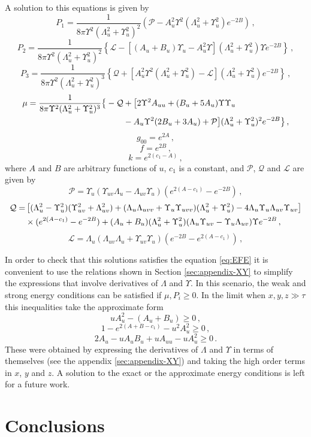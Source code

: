 \documentclass[12pt, ams, nofootinbib]{revtex4}
\def\be{\begin{equation}}
\def\ee{\end{equation}}
\def\X{\Lambda}
\def\Y{\Upsilon}
\newcommand{\rob}[1]{\left(#1\right)}    %
\newcommand{\sqb}[1]{\left[#1\right]}    %
\newcommand{\cub}[1]{\left\{#1\right\}}  %
\newcommand{\mc}[1]{\mathcal{#1}}        %
\theoremstyle{definition}
\begin{document}
A solution to this equations is given by
\be
	P_1 = \frac{1}{8\pi\Y^2(\X_u^2+\Y_u^2)^2}\rob{\mc{P}-A_u^2\Y^2(\X_u^2+\Y_u^2)e^{-2B}} \,,
\ee
\be
	P_2 = \frac{1}{8\pi\Y^2(\X_u^2+\Y_u^2)^2}\cub{\mc{L}-\sqb{(A_u+B_u)\Y_u-A_u^2\Y}(\X_u^2+\Y_u^2)\Y e^{-2B}}\,,
\ee
\be
	P_3 = \frac{1}{8\pi\Y^2(\X_u^2+\Y_u^2)^3}\cub{\mc{Q}+\sqb{A_u^2\Y^2(\X_u^2+\Y_u^2)-\mc{L}}(\X_u^2+\Y_u^2)e^{-2B}}\,,
\ee
\begin{align}
	\mu = \frac{1}{8\pi\Y^2(\X_u^2+\Y_u^2)^3}\big\{ -\mc{Q} &+ \big[2\Y^2A_{uu}+(B_u+5A_u)\Y\Y_u \notag \\
	&-A_u\Y^2(2B_u+3A_u)+\mc{P}\big](\X_u^2+\Y_u^2)^2e^{-2B} \big\}\,,
\end{align}
\be
	g_{00} = e^{2A}\,,
\ee
\be
	f = e^{2B}\,,
\ee
\be
	k = e^{2(c_1-A)}\,,	
\ee
where $A$ and $B$ are arbitrary functions of $u$, $c_1$ is a constant, and $\mathcal{P}$, $\mathcal{Q}$ and $\mathcal{L}$ are given by
\be
	\mathcal{P} = \Y_u\rob{\Y_{uv}\X_u-\X_{uv}\Y_u}(e^{2(A-c_1)}-e^{-2B})\,,
\ee
\begin{align}
	\mathcal{Q} =& 	\sqb{(\X_u^2-\Y_u^2)(\Y_{uv	}^2+\X_{uv}^2) + (\X_u \X_{uvv}+\Y_u \Y_{uvv})(\X_u^2+\Y_u^2) - 4\X_u \Y_u \X_{uv} \Y_{uv}}\notag\\
	&\times (e^{2(A-c_1)}-e^{-2B}) +(A_u+B_u)(\X_u^2+\Y_u^2)(\X_u \Y_{uv}-\Y_{u}\X_{uv})\Y e^{-2B} \,,
\end{align}
\be
	\mathcal{L} = \X_u\rob{\X_{uv}\X_u + \Y_{uv}\Y_u}(e^{-2B}-e^{2(A-c_1)})\,,
\ee

In order to check that this solutions satisfies the equation \ref{eq:EFE} it is convenient to use the relations shown in Section \ref{sec:appendix-XY} to simplify the expressions that involve derivatives of $\X$ and $\Y$. In this scenario, the weak and strong energy conditions can be satisfied if $\mu,P_i\geq 0$. In the limit when $x,y,z\gg \tau$ this inequalities take the approximate form 
\be
	uA_u^2-(A_u+B_u) \geq 0\,,
\ee
\be 
	1-e^{2(A+B-c_1)}-u^2A_u^2\geq 0\,,
\ee
\be
	2A_u-uA_uB_u+uA_{uu}-uA_u^2\geq 0\,.
\ee
These were obtained by expressing the derivatives of $\X$ and $\Y$ in terms of themselves (see the appendix \ref{sec:appendix-XY}) and taking the high order terms in $x$, $y$ and $z$. A solution to the exact or the approximate energy conditions is left for a future work.


\section{Conclusions}
\label{sec:conclusions}
\end{document}
